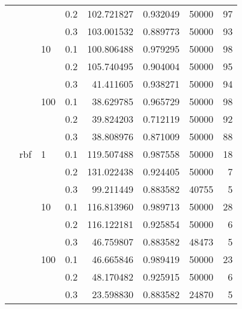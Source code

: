 \begin{table}[H]
\begin{tabular}{llllrrrr}
           &     &     & 0.2 &  102.721827 &  0.932049 &   50000 &    97 \\
           &     &     & 0.3 &  103.001532 &  0.889773 &   50000 &    93 \\
           &     & 10  & 0.1 &  100.806488 &  0.979295 &   50000 &    98 \\
           &     &     & 0.2 &  105.740495 &  0.904004 &   50000 &    95 \\
           &     &     & 0.3 &   41.411605 &  0.938271 &   50000 &    94 \\
           &     & 100 & 0.1 &   38.629785 &  0.965729 &   50000 &    98 \\
           &     &     & 0.2 &   39.824203 &  0.712119 &   50000 &    92 \\
           &     &     & 0.3 &   38.808976 &  0.871009 &   50000 &    88 \\
           & rbf & 1   & 0.1 &  119.507488 &  0.987558 &   50000 &    18 \\
           &     &     & 0.2 &  131.022438 &  0.924405 &   50000 &     7 \\
           &     &     & 0.3 &   99.211449 &  0.883582 &   40755 &     5 \\
           &     & 10  & 0.1 &  116.813960 &  0.989713 &   50000 &    28 \\
           &     &     & 0.2 &  116.122181 &  0.925854 &   50000 &     6 \\
           &     &     & 0.3 &   46.759807 &  0.883582 &   48473 &     5 \\
           &     & 100 & 0.1 &   46.665846 &  0.989419 &   50000 &    23 \\
           &     &     & 0.2 &   48.170482 &  0.925915 &   50000 &     6 \\
           &     &     & 0.3 &   23.598830 &  0.883582 &   24870 &     5 \\
\bottomrule
\end{tabular}
\end{table}
